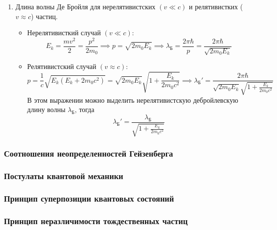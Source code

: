 \begin{enumerate}
	\item Длина волны Де Бройля для нерелятивистских $(v\ll c)$ и релятивистких ($v\approx c$) частиц.
	\begin{itemize}
		\item Нерелятивисткий случай $(v\ll c)$:
		\begin{equation*}
		E_k=\frac{mv^2}{2}=\frac{p^2}{2m_0}\implies p=\sqrt{2m_0E_k}\implies \lambda_\text{Б}=\frac{2\pi\hbar}{p}=\frac{2\pi\hbar}{\sqrt{2m_0E_k}}
		\end{equation*}
		\item Релятивистский случай $(v\approx c)$:
		\begin{equation*}
		p=\frac{1}{c}\sqrt{E_k(E_k+2m_0c^2)}=\sqrt{2m_0E_k}\sqrt{1+\frac{E_k}{2m_0c^2}}\implies\lambda_\text{Б}'=\frac{2\pi\hbar}{\sqrt{2m_0E_k}\sqrt{1+\frac{E_k}{2m_0c^2}}}
		\end{equation*}
		В этом выражении можно выделить нерелятивистскую дебройлевскую длину волны $\lambda_\text{Б}$, тогда 
		\begin{equation*}
			\lambda_\text{Б}'=\frac{\lambda_\text{Б}}{\sqrt{1+\frac{E_k}{2m_0c^2}}}
		\end{equation*}
	\end{itemize}
\end{enumerate}



\subsubsection{Соотношения неопределенностей Гейзенберга}

\subsubsection{Постулаты квантовой механики}

\subsubsection{Принцип суперпозиции квантовых состояний}

\subsubsection{Принцип неразличимости тождественных частиц}
